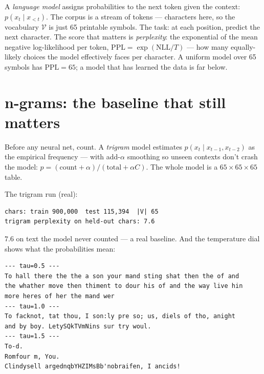 A \emph{language model} assigns probabilities to
the next token given the context: $p(x_t \mid x_{<t})$. The corpus is
a stream of tokens --- characters here, so the vocabulary $\mathcal V$
is just 65 printable symbols. The task: at each position, predict the
next character. The score that matters is
\emph{perplexity}: the exponential of the mean
negative log-likelihood per token,
$\mathrm{PPL}=\exp(\mathrm{NLL}/T)$ --- how many equally-likely
choices the model effectively faces per character. A uniform model
over 65 symbols has $\mathrm{PPL}=65$; a model that has learned the
data is far below.

\section{n-grams: the baseline that still matters}
\label{sec:ngram}

Before any neural net, count. A \emph{trigram} model
estimates $p(x_t\mid x_{t-1},x_{t-2})$ as the empirical frequency ---
with add-$\alpha$ smoothing so unseen contexts don't
crash the model: $p=(\mathrm{count}+\alpha)/(\mathrm{total}+\alpha
C)$. The whole model is a $65\times65\times65$ table.



\begin{example}
\label{ex:trigram}
The trigram run (real):
\end{example}
\begin{verbatim}
chars: train 900,000  test 115,394  |V| 65
trigram perplexity on held-out chars: 7.6
\end{verbatim}
$7.6$ on text the model never counted --- a real baseline. And the
temperature dial shows what the probabilities mean:

\begin{verbatim}
--- tau=0.5 ---
To hall there the the a son your mand sting shat then the of and
the whather move then thiment to dour his of and the way live hin
more heres of her the mand wer
--- tau=1.0 ---
To facknot, tat thou, I son:ly pre so; us, diels of tho, anight
and by boy. LetySQkTVmNins sur try woul.
--- tau=1.5 ---
To-d.
Romfour m, You.
Clindysell argednqbYHZIMsBb'nobraifen, I ancids!
\end{verbatim}

